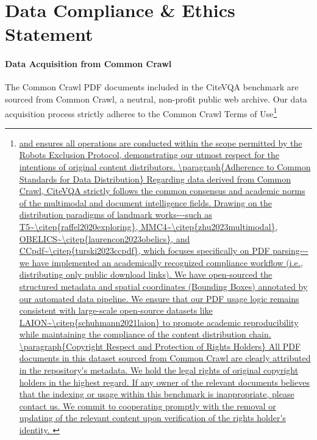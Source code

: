 \documentclass{llmxive}
\providecommand{\beginappendix}{\appendix{\LARGE\bfseries Appendix\par}}
\begin{document}
{{\small


}



\beginappendix

\section{Data Compliance \& Ethics Statement}
\label{Appendix: Ethical Consideration}
\paragraph{Data Acquisition from Common Crawl} The Common Crawl PDF documents included in the CiteVQA benchmark are sourced from Common Crawl, a neutral, non-profit public web archive. Our data acquisition process strictly adheres to the Common Crawl Terms of Use\footnote{\url{ and ensures all operations are conducted within the scope permitted by the Robots Exclusion Protocol, demonstrating our utmost respect for the intentions of original content distributors.

\paragraph{Adherence to Common Standards for Data Distribution}
Regarding data derived from Common Crawl, CiteVQA strictly follows the common consensus and academic norms of the multimodal and document intelligence fields. Drawing on the distribution paradigms of landmark works---such as T5~\citep{raffel2020exploring}, MMC4~\citep{zhu2023multimodal}, OBELICS~\citep{laurencon2023obelics}, and CCpdf~\citep{turski2023ccpdf}, which focuses specifically on PDF parsing---we have implemented an academically recognized compliance workflow (i.e., distributing only public download links).

We have open-sourced the structured metadata and spatial coordinates (Bounding Boxes) annotated by our automated data pipeline. We ensure that our PDF usage logic remains consistent with large-scale open-source datasets like LAION~\citep{schuhmann2021laion} to promote academic reproducibility while maintaining the compliance of the content distribution chain.

\paragraph{Copyright Respect and Protection of Rights Holders} All PDF documents in this dataset sourced from Common Crawl are clearly attributed in the repository's metadata. We hold the legal rights of original copyright holders in the highest regard. If any owner of the relevant documents believes that the indexing or usage within this benchmark is inappropriate, please contact us. We commit to cooperating promptly with the removal or updating of the relevant content upon verification of the rights holder's identity.

}}}
\end{document}
